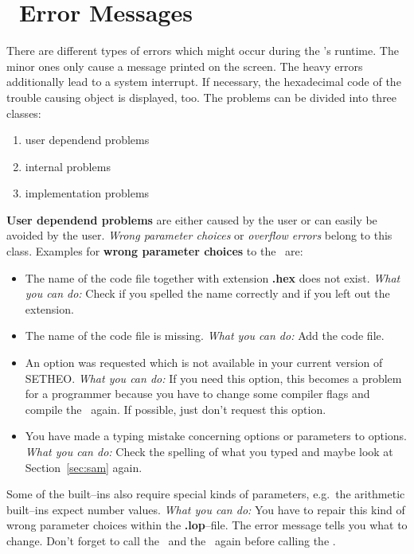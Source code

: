 %

\section{\SAM\ Error Messages}\label{sec:errors}

There are different types of errors which might occur during the \SAM's
runtime. The minor ones only cause a message printed on the
screen. The heavy errors additionally lead to a system interrupt. If
necessary, the hexadecimal code of the trouble causing object is
displayed, too. 
The problems can be divided into three classes: 
\begin{enumerate}
\item{user dependend problems}
\item{internal problems}
\item{implementation problems}
\end{enumerate}

{\bf User dependend problems} are either caused by the user or can
easily be avoided by the user. {\it Wrong parameter choices\/} or {\it
overflow errors\/} belong to this class. Examples for {\bf wrong
parameter choices} to the \SAM\ are: 
\begin{itemize}
\item{The name of the code file together with extension {\bf .hex}
      does not exist.
      {\it What you can do:\/} Check if you spelled the name correctly
      and if you left out the extension.}
\item{The name of the code file is missing.
      {\it What you can do:\/} Add the code file.}
\item{An option was requested which is not available in your current
      version of SETHEO.
      {\it What you can do:\/} If you need this option, this becomes a
      problem for a programmer because you have to change some
      compiler flags and compile the \SAM\ again. If possible, just
      don't request this option.}
\item{You have made a typing mistake concerning options or parameters
      to options.
      {\it What you can do:\/} Check the spelling of what you typed and
      maybe look at Section~\ref{sec:sam} again.}
\end{itemize}
Some of the built--ins also require special kinds of parameters, e.g.\
the arithmetic built--ins expect number values.
{\it What you can do:\/} You have to repair this kind of wrong
parameter choices within the {\bf .lop}--file. The error message tells
you what to change. Don't forget to call the \inw\ and the \wasm\ again
before calling the \SAM.

